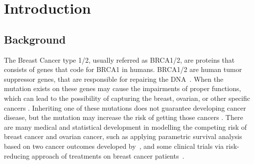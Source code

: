 \chapter{Introduction}
\section{Background}
The Breast Cancer type 1/2, usually referred as BRCA1/2, are proteins that consists of genes that code for BRCA1 in humans. BRCA1/2 are human tumor suppressor genes, that are responsible for repairing the DNA~\cite{duncan1998brca1}. 
When the mutation exists on these genes may cause the impairments of proper functions, which can lead to the possibility of capturing the breast, ovarian, or other specific cancers \cite{greer2006role, haffty2002outcome, huang2018association}. 
Inheriting one of these mutations does not guarantee developing cancer disease, but the mutation may increase the risk of getting those cancers \cite{friedenson2007brca1}. There are many medical and statistical development in modelling the competing risk
of breast cancer and ovarian cancer, such as applying parametric survival analysis based on two cancer outcomes developed by~\citet{choi2021competing}, and some clinical trials via risk-reducing approach of treatments on breast cancer patients~\cite{choi2021association}.

